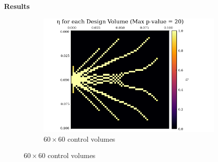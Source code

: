 \documentclass[final]{beamer}
\begin{document}
\begin{frame}{\textbf{Results}}
\begin{figure}
\begin{center}
\begin{subfigure}{0.5\textwidth}
				\includegraphics[width=\linewidth]{60x60-Final_Design.png}
				\caption{$60\times 60$ control volumes}
				\label{fig:SIMP-Output-60}
			\end{subfigure}
		\end{center}
	\end{figure}
\end{frame}
\end{document}
